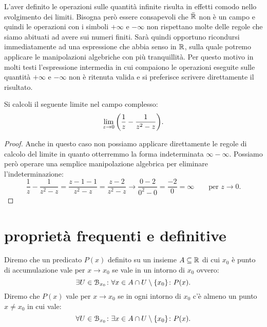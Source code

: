 L'aver definito le operazioni sulle quantità infinite
risulta in effetti comodo nello svolgimento dei limiti.
Bisogna però essere consapevoli che $\bar {\mathbb R}$ non è un campo
e quindi le operazioni con i simboli $+\infty$ e $-\infty$
non rispettano molte delle regole che siamo abituati
ad avere sui numeri finiti.
Sarà quindi opportuno ricondursi immediatamente ad una espressione
che abbia senso in $\mathbb R$, sulla quale potremo
applicare le manipolazioni algebriche con più tranquillità.
Per questo motivo in molti testi l'espressione intermedia in cui compaiono 
le operazioni eseguite sulle quantità $+\infty$ e $-\infty$ non è ritenuta valida
e si preferisce scrivere direttamente il risultato.
  
\begin{example}
Si calcoli il seguente limite nel campo complesso:
\[
\lim_{z\to 0} {\left( \frac 1 {z} - \frac 1 {z^2-z} \right)}. 
\]
\end{example}
\begin{proof}
  Anche in questo caso non possiamo applicare direttamente le regole 
  di calcolo del limite in quanto otterremmo la forma indeterminata 
  $\infty - \infty$.
  Possiamo però operare una semplice manipolazione algebrica
  per eliminare l'indeterminazione:
  \[
    \frac 1 {z} - \frac 1 {z^2-z}
    = \frac{z- 1 - 1}{z^2-z}
    = \frac{z-2}{z^2-z}
    \to \frac{0-2}{0^2-0} = \frac{-2}{0} = \infty 
    \qquad \text{per $z\to 0.$}
  \]
\end{proof}

\begin{comment} %
\begin{exercise}
  Calcolare 
  \[
  \lim_{x\to 0^+} x^x.
  \]
\end{exercise}

\begin{exercise}
  Trovare un esempio di funzioni $f(x)$ e $g(x)$ tali che 
  \[
     \lim_{x\to 0} f(x) = 0, \qquad 
     \lim_{x\to 0} g(x) = 0
  \]
  ma 
  \[
    \lim_{x\to 0} f(x)^{g(x)} \neq 1.
  \]
\end{exercise}
\end{comment}

\section{proprietà frequenti e definitive}

\begin{definition}
Diremo che un predicato $P(x)$ definito su un insieme $A\subseteq \mathbb R$ 
di cui $x_0$ è punto di accumulazione vale 
 per $x\to x_0$ se
vale in un intorno di $x_0$ ovvero:
\[
  \exists U\in \mathcal B_{x_0}\colon \forall x \in A\cap U\setminus{\left\{ x_0 \right\}}\colon P(x).
\]
Diremo che $P(x)$ vale  per $x\to x_0$
se in ogni intorno di $x_0$ c'è almeno un punto $x\neq x_0$ 
in cui vale:
\[
  \forall U\in \mathcal B_{x_0}\colon \exists x\in A\cap U\setminus{\left\{ x_0 \right\}}
  \colon P(x).
\]
\end{definition}

